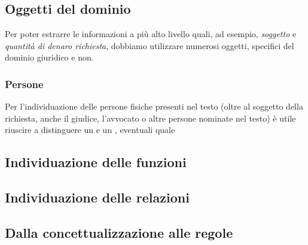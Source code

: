 \subsection{Oggetti del dominio}
Per poter estrarre le informazioni a più alto livello quali, ad esempio, \emph{soggetto} e \emph{quantità di denaro richiesta}, dobbiamo utilizzare numerosi oggetti, specifici del dominio giuridico e non.

\subsubsection{Persone}
Per l'individuazione delle persone fisiche presenti nel testo (oltre al soggetto della richiesta, anche il giudice, l'avvocato o altre persone nominate nel testo) è utile riuscire a distinguere un  e un , eventuali  quale 


\subsection{Individuazione delle funzioni}

\subsection{Individuazione delle relazioni}

\subsection{Dalla concettualizzazione alle regole}

